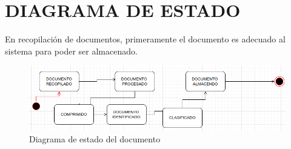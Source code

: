 \chapter*{DIAGRAMA DE ESTADO}
En recopilación de documentos, primeramente el documento es adecuado al sistema para poder ser almacenado. 
\begin{figure}[ht]
	\centering
	\includegraphics[scale=0.8]{images/estado1}
	\caption{Diagrama de estado del documento}
\end{figure}